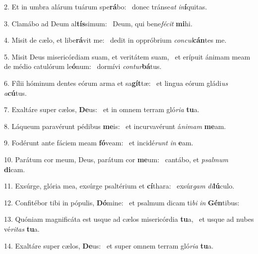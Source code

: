 2. Et in umbra alárum tuárum spe\textbf{rá}bo: \ast\  donec tránse\textit{at} \textit{in}\textbf{í}quitas.\

3. Clamábo ad Deum al\textbf{tís}simum: \ast\  Deum, qui bene\textit{fé}\textit{cit} \textbf{mi}hi.\

4. Misit de cælo, et libe\textbf{rá}vit me: \ast\  dedit in oppróbrium \textit{con}\textit{cul}\textbf{cán}tes me.\

5. Misit Deus misericórdiam suam, et veritátem suam, \dag\  et erípuit ánimam meam de médio catulórum le\textbf{ó}num: \ast\  dormívi \textit{con}\textit{tur}\textbf{bá}tus.\

6. Fílii hóminum dentes eórum arma et sa\textbf{gít}tæ: \ast\  et lingua eórum gládi\textit{us} \textit{a}\textbf{cú}tus.\

7. Exaltáre super cælos, \textbf{De}us: \ast\  et in omnem terram gló\textit{ri}\textit{a} \textbf{tu}a.\

8. Láqueum paravérunt pédibus \textbf{me}is: \ast\  et incurvavérunt á\textit{ni}\textit{mam} \textbf{me}am.\

9. Fodérunt ante fáciem meam \textbf{fó}veam: \ast\  et incidé\textit{runt} \textit{in} \textbf{e}am.\

10. Parátum cor meum, Deus, parátum cor \textbf{me}um: \ast\  cantábo, et \textit{psal}\textit{mum} \textbf{di}cam.\

11. Exsúrge, glória mea, exsúrge psaltérium et \textbf{cí}thara: \ast\  exsúr\textit{gam} \textit{di}\textbf{lú}culo.\

12. Confitébor tibi in pópulis, \textbf{Dó}mine: \ast\  et psalmum dicam ti\textit{bi} \textit{in} \textbf{Gén}tibus:\

13. Quóniam magnificáta est usque ad cælos misericórdia \textbf{tu}a, \ast\  et usque ad nubes vé\textit{ri}\textit{tas} \textbf{tu}a.\

14. Exaltáre super cælos, \textbf{De}us: \ast\  et super omnem terram gló\textit{ri}\textit{a} \textbf{tu}a.\

